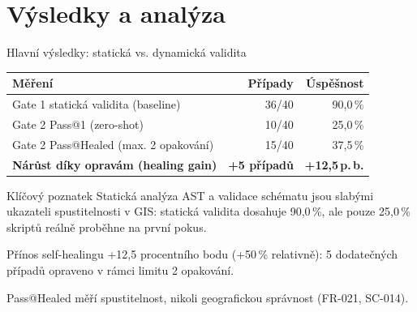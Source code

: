 \documentclass[aspectratio=169,11pt]{beamer}
\begin{document}
\section{Výsledky a analýza}

\begin{frame}[t]{Hlavní výsledky: statická vs. dynamická validita}
  \small
  \begin{table}
    \centering
    \begin{tabular}{@{}lrr@{}}
      \toprule
      \textbf{Měření} & \textbf{Případy} & \textbf{Úspěšnost} \\
      \midrule
      Gate 1 statická validita (baseline) & 36/40 & 90,0\,\% \\
      Gate 2 Pass@1 (zero-shot) & 10/40 & 25,0\,\% \\
      Gate 2 Pass@Healed (max. 2 opakování) & 15/40 & 37,5\,\% \\
      \midrule
      \textbf{Nárůst díky opravám (healing gain)} & \textbf{+5 případů}
        & \textbf{+12,5\,p.\,b.} \\
      \bottomrule
    \end{tabular}
  \end{table}

  \begin{alertblock}{Klíčový poznatek}
    Statická analýza AST a validace schématu jsou slabými ukazateli
    spustitelnosti v GIS: statická validita dosahuje 90,0\,\%, ale pouze
    25,0\,\% skriptů reálně proběhne na první pokus.
  \end{alertblock}

  \begin{exampleblock}{Přínos self-healingu}
    +12,5 procentního bodu (+50\,\% relativně): 5 dodatečných případů opraveno
    v rámci limitu 2 opakování.
  \end{exampleblock}

  {\footnotesize Pass@Healed měří spustitelnost, nikoli geografickou správnost
  (FR-021, SC-014).}
\end{frame}
\end{document}
